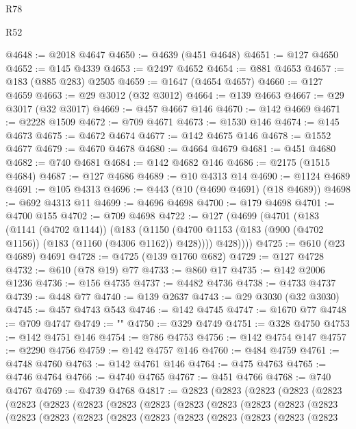 \begin{lexlean}{R78}
\begin{lexlean}{R52}
\begin{coremodule}
{{{{{{{{{{{{{{{{{{{{{{{{{{{{{{{{{{{{{{{{{{{{{{{{{{{{{{{{{{{{{{{{{{{{{{{{{{{{{{{{{{{{{{{{{{{{{{{{{{{{{{{{{{{{{{{{{{{{{{{{{{{{{{{{{{{{{{{{{{{{{{{{{{{{{{{{{{{{{{{{{{{{{{{{{{{{{{{{{{{{{{{{{{{{{{{{{{{{{{@4648 := @2018 @4647
@4650 := @4639 (@451 @4648)
@4651 := @127 @4650
@4652 := @145 @4339
@4653 := @2497 @4652
@4654 := @881 @4653
@4657 := @183 (@885 @283) @2505
@4659 := @1647 (@4654 @4657)
@4660 := @127 @4659
@4663 := @29 @3012 (@32 @3012)
@4664 := @139 @4663
@4667 := @29 @3017 (@32 @3017)
@4669 := @457 @4667 @146
@4670 := @142 @4669
@4671 := @2228 @1509
@4672 := @709 @4671
@4673 := @1530 @146
@4674 := @145 @4673
@4675 := @4672 @4674
@4677 := @142 @4675 @146
@4678 := @1552 @4677
@4679 := @4670 @4678
@4680 := @4664 @4679
@4681 := @451 @4680
@4682 := @740 @4681
@4684 := @142 @4682 @146
@4686 := @2175 (@1515 @4684)
@4687 := @127 @4686
@4689 := @10 @4313 @14
@4690 := @1124 @4689
@4691 := @105 @4313
@4696 := @443 (@10 (@4690 @4691) (@18 @4689))
@4698 := @692 @4313 @11
@4699 := @4696 @4698
@4700 := @179 @4698
@4701 := @4700 @155
@4702 := @709 @4698
@4722 := @127
    (@4699
      (@4701
        (@183
          (@1141 (@4702 @1144))
          (@183
            (@1150 (@4700 @1153 (@183 (@900 (@4702 @1156)) (@183 (@1160 (@4306 @1162)) @428))))
            @428))))
@4725 := @610 (@23 @4689) @4691
@4728 := @4725 (@139 @1760 @682)
@4729 := @127 @4728
@4732 := @610 (@78 @19) @77
@4733 := @860 @17
@4735 := @142 @2006 @1236
@4736 := @156 @4735
@4737 := @4482 @4736
@4738 := @4733 @4737
@4739 := @448 @77
@4740 := @139 @2637
@4743 := @29 @3030 (@32 @3030)
@4745 := @457 @4743 @543
@4746 := @142 @4745
@4747 := @1670 @77
@4748 := @709 @4747
@4749 := "\n"
@4750 := @329 @4749
@4751 := @328 @4750
@4753 := @142 @4751 @146
@4754 := @786 @4753
@4756 := @142 @4754 @147
@4757 := @2290 @4756
@4759 := @142 @4757 @146
@4760 := @484 @4759
@4761 := @4748 @4760
@4763 := @142 @4761 @146
@4764 := @475 @4763
@4765 := @4746 @4764
@4766 := @4740 @4765
@4767 := @451 @4766
@4768 := @740 @4767
@4769 := @4739 @4768
@4817 := @2823
    (@2823
      (@2823
        (@2823
          (@2823
            (@2823
              (@2823
                (@2823
                  (@2823
                    (@2823
                      (@2823
                        (@2823
                          (@2823
                            (@2823
                              (@2823
                                (@2823
                                  (@2823
                                    (@2823
                                      (@2823
                                        (@2823
                                          (@2823
                                            (@2823
                                              (@2823
                                                (@2823
                                                  (@2823
}}}}}}}}}}}}}}}}}}}}}}}}}}}}}}}}}}}}}}}}}}}}}}}}}}}}}}}}}}}}}}}}}}}}}}}}}}}}}}}}}}}}}}}}}}}}}}}}}}}}}}}}}}}}}}}}}}}}}}}}}}}}}}}}}}}}}}}}}}}}}}}}}}}}}}}}}}}}}}}}}}}}}}}}}}}}}}}}}}}}}}}}}}}}}}}}}}}}}}
\end{coremodule}
\end{lexlean}
\end{lexlean}
